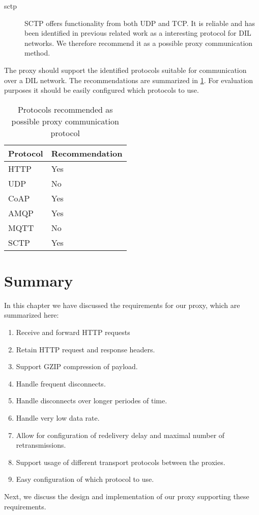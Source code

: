 \begin{description}
    \item[\gls{sctp}] SCTP offers functionality from both UDP and TCP. It is
    reliable and has been identified in previous related work as a interesting
    protocol for DIL networks. We therefore recommend it as a possible proxy
    communication method.

\end{description}

The proxy should support the identified protocols suitable for communication
over a DIL network. The recommendations are summarized in
\cref{table:possible-proxy-protocols}. For evaluation purposes it should be
easily configured which protocols to use.

\begin{table}[h]
\begin{tabularx}{\textwidth}{| X | X |}
\hline
  \textbf{Protocol} & \textbf{Recommendation} \\ \hline
  HTTP & Yes \\ \hline
  UDP & No \\ \hline
  CoAP & Yes \\ \hline
  AMQP & Yes \\ \hline
  MQTT & No \\ \hline
  SCTP & Yes \\ \hline
\end{tabularx}
\caption{Protocols recommended as possible proxy communication protocol}
\label{table:possible-proxy-protocols}
\end{table}



\section{Summary}

In this chapter we have discussed the requirements for our proxy, which are
summarized here:

\begin{enumerate}
    \item Receive and forward HTTP requests
    \item Retain HTTP request and response headers.
    \item Support GZIP compression of payload.
    \item Handle frequent disconnects.
    \item Handle disconnects over longer periodes of time.
    \item Handle very low data rate.
    \item Allow for configuration of redelivery delay and maximal number of retransmissions.
    \item Support usage of different transport protocols between the proxies.
    \item Easy configuration of which protocol to use.
\end{enumerate}

Next, we discuss the design and implementation of our proxy supporting these
requirements.
